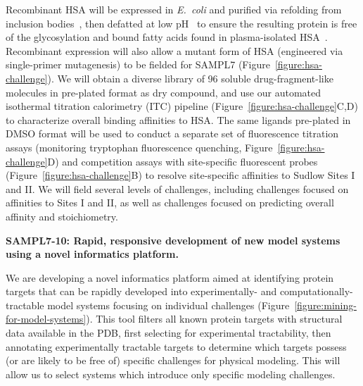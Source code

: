\documentclass[11pt]{article}
\begin{document}
Recombinant HSA will be expressed in \emph{E.~coli} and purified via refolding from inclusion bodies~\cite{Latta:1987:Bio/Technology}, then defatted at low pH~\cite{Lang:2015:BiotechnologyProgress} to ensure the resulting protein is free of the glycosylation and bound fatty acids found in plasma-isolated HSA~\cite{Lang:2015:BiotechnologyProgress}.
Recombinant expression will also allow a mutant form of HSA (engineered via single-primer mutagenesis) to be fielded for SAMPL7 (Figure~\ref{figure:hsa-challenge}).
We will obtain a diverse library of 96 soluble drug-fragment-like molecules in pre-plated format as dry compound, and use our automated isothermal titration calorimetry (ITC) pipeline (Figure~\ref{figure:hsa-challenge}C,D) to characterize overall binding affinities to HSA.
The same ligands pre-plated in DMSO format will be used to conduct a separate set of fluorescence titration assays (monitoring tryptophan fluorescence quenching, Figure~\ref{figure:hsa-challenge}D) and competition assays with site-specific fluorescent probes (Figure~\ref{figure:hsa-challenge}B) to resolve site-specific affinities to Sudlow Sites I and II.
We will field several levels of challenges, including challenges focused on affinities to Sites I and II, as well as challenges focused on predicting overall affinity and stoichiometry.

\textbf{SAMPL7-10: Rapid, responsive development of new model systems using a novel informatics platform.}

We are developing a novel informatics platform aimed at identifying protein targets that can be rapidly developed into experimentally- and computationally-tractable model systems focusing on individual challenges (Figure~\ref{figure:mining-for-model-systems}).
This tool filters all known protein targets with structural data available in the PDB, first selecting for experimental tractability, then annotating experimentally tractable targets to determine which targets possess (or are likely to be free of) specific challenges for physical modeling.
This will allow us to select systems which introduce only specific modeling challenges.
\end{document}
